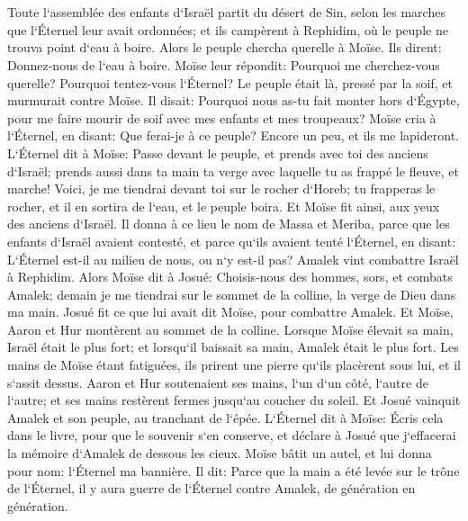 \chapter{}

\verse Toute l`assemblée des enfants d`Israël partit du désert de Sin, selon les marches que l`Éternel leur avait ordonnées; et ils campèrent à Rephidim, où le peuple ne trouva point d`eau à boire. 
\verse Alors le peuple chercha querelle à Moïse. Ils dirent: Donnez-nous de l`eau à boire. Moïse leur répondit: Pourquoi me cherchez-vous querelle? Pourquoi tentez-vous l`Éternel? 
\verse Le peuple était là, pressé par la soif, et murmurait contre Moïse. Il disait: Pourquoi nous as-tu fait monter hors d`Égypte, pour me faire mourir de soif avec mes enfants et mes troupeaux? 
\verse Moïse cria à l`Éternel, en disant: Que ferai-je à ce peuple? Encore un peu, et ils me lapideront. 
\verse L`Éternel dit à Moïse: Passe devant le peuple, et prends avec toi des anciens d`Israël; prends aussi dans ta main ta verge avec laquelle tu as frappé le fleuve, et marche! 
\verse Voici, je me tiendrai devant toi sur le rocher d`Horeb; tu frapperas le rocher, et il en sortira de l`eau, et le peuple boira. Et Moïse fit ainsi, aux yeux des anciens d`Israël. 
\verse Il donna à ce lieu le nom de Massa et Meriba, parce que les enfants d`Israël avaient contesté, et parce qu`ils avaient tenté l`Éternel, en disant: L`Éternel est-il au milieu de nous, ou n`y est-il pas? 
\verse Amalek vint combattre Israël à Rephidim. 
\verse Alors Moïse dit à Josué: Choisis-nous des hommes, sors, et combats Amalek; demain je me tiendrai sur le sommet de la colline, la verge de Dieu dans ma main. 
\verse Josué fit ce que lui avait dit Moïse, pour combattre Amalek. Et Moïse, Aaron et Hur montèrent au sommet de la colline. 
\verse Lorsque Moïse élevait sa main, Israël était le plus fort; et lorsqu`il baissait sa main, Amalek était le plus fort. 
\verse Les mains de Moïse étant fatiguées, ils prirent une pierre qu`ils placèrent sous lui, et il s`assit dessus. Aaron et Hur soutenaient ses mains, l`un d`un côté, l`autre de l`autre; et ses mains restèrent fermes jusqu`au coucher du soleil. 
\verse Et Josué vainquit Amalek et son peuple, au tranchant de l`épée. 
\verse L`Éternel dit à Moïse: Écris cela dans le livre, pour que le souvenir s`en conserve, et déclare à Josué que j`effacerai la mémoire d`Amalek de dessous les cieux. 
\verse Moïse bâtit un autel, et lui donna pour nom: l`Éternel ma bannière. 
\verse Il dit: Parce que la main a été levée sur le trône de l`Éternel, il y aura guerre de l`Éternel contre Amalek, de génération en génération. 

